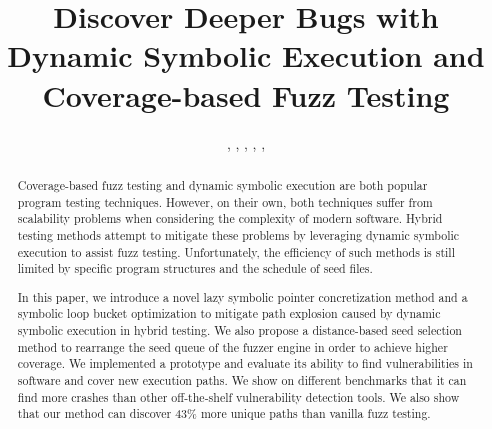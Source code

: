 \documentclass{cta-author}
\begin{document}

\title{Discover Deeper Bugs with Dynamic Symbolic Execution 
	and Coverage-based Fuzz Testing}

\author{, 
	, 
	, 
	, 
	, 
	}
%
\address{
}

\begin{abstract}
Coverage-based fuzz testing and dynamic symbolic execution are both 
popular program testing techniques. However, on their own, both techniques 
suffer from scalability problems when considering the complexity of 
modern software. Hybrid testing methods attempt to mitigate these 
problems by leveraging dynamic symbolic execution to assist fuzz 
testing. Unfortunately, the efficiency of such methods is still 
limited by specific program structures and the schedule of seed files.

In this paper, we introduce a novel lazy symbolic pointer concretization 
method and a symbolic loop bucket optimization to mitigate path explosion 
caused by dynamic symbolic execution in hybrid testing.
We also propose a distance-based seed selection method to rearrange the 
seed queue of the fuzzer engine in order to achieve higher coverage. We implemented 
a prototype and evaluate its ability to find vulnerabilities in software 
and cover new execution paths. We show on different benchmarks that 
it can find more crashes than other off-the-shelf vulnerability 
detection tools. We also show that our method can discover 43\% more 
unique paths than vanilla fuzz testing.
\end{abstract}

\maketitle
\end{document}
